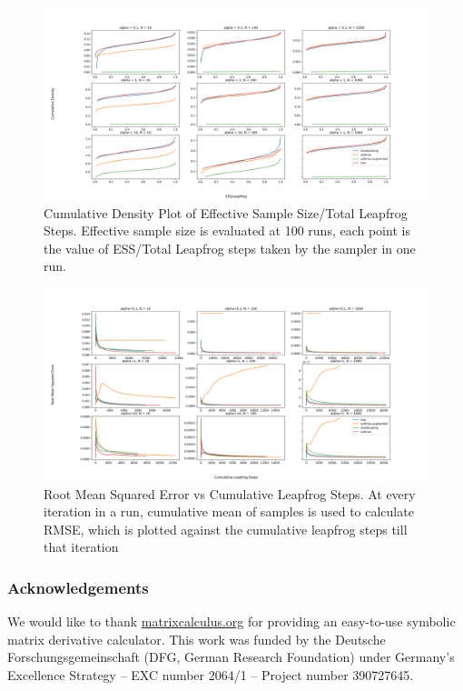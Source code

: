 \documentclass[11pt]{article}
\begin{document}
\begin{figure}[t!]
    \centering
    \includegraphics[width=1.2\textwidth]{figures/simplex/ess_cdf.png}
    \caption{Cumulative Density Plot of Effective Sample Size/Total Leapfrog Steps. Effective sample size is evaluated at 100 runs, each point is the value of ESS/Total Leapfrog steps taken by the sampler in one run.}
    \label{fig:ess_cdf}
\end{figure}

\begin{figure}[t!]
    \centering
    \includegraphics[width=1.2\textwidth]{figures/simplex/rmse.png}
    \caption{Root Mean Squared Error vs Cumulative Leapfrog Steps. At every iteration in a run, cumulative mean of samples is used to calculate RMSE, which is plotted against the cumulative leapfrog steps till that iteration}
    \label{fig:rmse}
\end{figure}

\subsubsection*{Acknowledgements}

We would like to thank \url{matrixcalculus.org} for providing an
easy-to-use symbolic matrix derivative calculator.
This work was funded by the Deutsche Forschungsgemeinschaft (DFG, German Research Foundation) under Germany’s Excellence Strategy – EXC number 2064/1 – Project number 390727645.


{}



\end{document}
